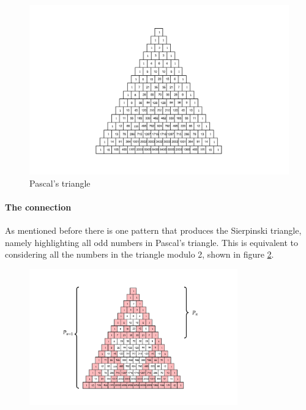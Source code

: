 \documentclass[a4paper,11pt,twoside]{article}
\begin{document}
\begin{figure}[htbp]
\centering
\includegraphics[width=.9\linewidth]{media/tikz/pascals-triangle.png}
\caption{\label{fig:pascal-triangle}Pascal's triangle}
\end{figure}
\paragraph{The connection}
\label{sec:org5ec730a}
As mentioned before there is one pattern that produces the Sierpinski triangle, namely highlighting all odd numbers in Pascal's triangle. This is equivalent to considering all the numbers in the triangle modulo 2, shown in figure \ref{fig:pascal-sierpinski-tri}.

\begin{figure}[htbp]
\centering
\includegraphics[width=9cm]{media/tikz/pascal-sierpinski-tri.png}
\label{fig:pascal-sierpinski-tri}
\end{figure}
\end{document}
